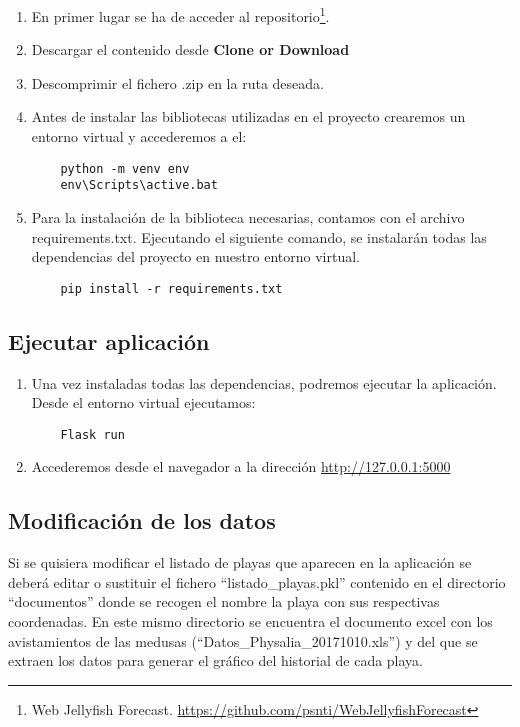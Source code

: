 \begin{enumerate}
	\item En primer lugar se ha de acceder al repositorio\footnote{Web Jellyfish Forecast. \url{https://github.com/psnti/WebJellyfishForecast}}.
	\item Descargar el contenido desde \textbf{Clone or Download}
	\label{clone}
	\item Descomprimir el fichero .zip en la ruta deseada.
	\item Antes de instalar las bibliotecas utilizadas en el proyecto crearemos un entorno virtual y accederemos a el:
	\begin{verbatim}
	python -m venv env
	env\Scripts\active.bat
	\end{verbatim}
	\item Para la instalación de la biblioteca necesarias, contamos con el archivo requirements.txt. Ejecutando el siguiente comando, se instalarán todas las dependencias del proyecto en  nuestro entorno virtual.
	\begin{verbatim}
	pip install -r requirements.txt
	\end{verbatim}
	
\end{enumerate}

\subsection{Ejecutar aplicación}

\begin{enumerate}
	\item Una vez instaladas todas las dependencias, podremos ejecutar la aplicación. Desde el entorno virtual ejecutamos:
	\begin{verbatim}
	Flask run
	\end{verbatim}
	\item Accederemos desde el navegador a la dirección \href{http://127.0.0.1:5000}{http://127.0.0.1:5000}
	
\end{enumerate}

\subsection{Modificación de los datos}

Si se quisiera modificar el listado de playas que aparecen en la aplicación se deberá editar o sustituir el fichero ``listado\_playas.pkl'' contenido en el directorio ``documentos'' donde se recogen el nombre la playa con sus respectivas coordenadas. En este mismo directorio se encuentra el documento excel con los avistamientos de las medusas (``Datos\_Physalia\_20171010.xls'') y del que se extraen los datos para generar el gráfico del historial de cada playa. 

